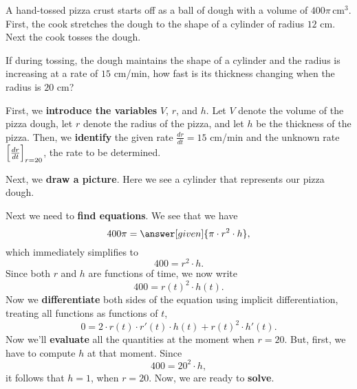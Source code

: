 \documentclass{ximera}
\begin{document}
\begin{example}
A hand-tossed pizza crust starts off as a ball of dough with a volume
of $400\pi\, \text{cm}^3$. First, the cook stretches the dough to the
shape of a cylinder of radius $12$ cm. Next the cook tosses the
dough.

If during tossing, the dough maintains the shape of a cylinder and the
radius is increasing at a rate of $15$ cm/min, how fast is its
thickness changing when the radius is $20$ cm?
\begin{explanation}
 First, we \textbf{introduce the variables} $V$, $r$, and $h$. Let $V$ denote the volume of the pizza dough, let $r$ denote the radius of the pizza, and  let $h$ be the thickness of the pizza. Then, we \textbf{identify} the given rate $\frac{dr}{dt}=15$ cm/min and the unknown rate $\Bigl[\frac{dr}{dt}\Bigr]_{r=20}$, the rate to be determined.   

  Next, we \textbf{draw a picture}. Here we see a cylinder that
  represents our pizza dough.
  \begin{image}
  \end{image}
  Next we need to \textbf{find equations}. We see that we have
  \[
  400\pi = \answer[given]{\pi \cdot r^2 \cdot h},
  \]
  which immediately simplifies to
  \[
  400 = r^2 \cdot h.
  \]
  Since both $r$ and $h$ are functions of time, we now write
  \[
  400 = r(t)^2 \cdot h(t).
  \]
  Now we \textbf{differentiate} both sides of  the equation using implicit
  differentiation, treating all functions as functions of $t$,
  \[
  0 = 2\cdot r(t) \cdot r'(t) \cdot h(t) + r(t)^2 \cdot h'(t).
  \]
  Now we'll \textbf{evaluate} all  the quantities at the moment when $r=20$. 
  But, first, we have to compute $h$ at that moment. Since
  \[
 400 = 20^2 \cdot h, 
  \] it follows that $h=1$, when $r=20$. Now, we are ready to \textbf{solve}.
  

\end{explanation}
\end{example}
\end{document}
